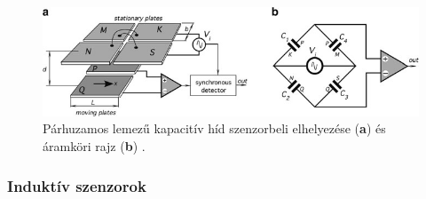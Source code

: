 \begin{figure}
	\centering
	\includegraphics[width=\columnwidth]{figures/kapacitiv_hid.png}
	\caption{Párhuzamos lemezű kapacitív híd szenzorbeli elhelyezése (\textbf{a}) és áramköri rajz (\textbf{b}) \cite{Fraden2016a}.}
	\label{kapacitiv_hid}
\end{figure}

\subsubsection{Induktív szenzorok}
\label{linind}

